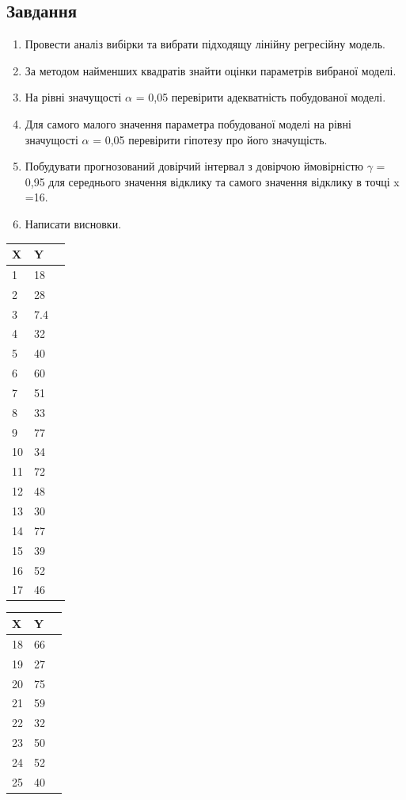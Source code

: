 \documentclass{article}
\begin{document}
    \subsection{Завдання}
      \begin{enumerate}
        \item Провести аналіз вибірки та вибрати підходящу лінійну регресійну модель.
        \item За методом найменших квадратів знайти оцінки параметрів вибраної моделі.
        \item На рівні значущості $\alpha$ = 0,05 перевірити адекватність побудованої моделі.
        \item Для самого малого значення параметра побудованої моделі на рівні значущості
        $\alpha$ = 0,05 перевірити гіпотезу про його значущість.
        \item Побудувати прогнозований довірчий інтервал з довірчою ймовірністю $\gamma$ = 0,95 
        для середнього значення відклику та самого значення відклику в точці x =16.
        \item Написати висновки.
      \end{enumerate}
      \begin{center}
        \begin{tabular}{| l | l | l |}
          \hline
          X & Y \\
          \hline
          1 & 18 \\
          2 & 28 \\
          3 & 7.4 \\
          4 & 32 \\
          5 & 40 \\
          6 & 60 \\
          7 & 51 \\
          8 & 33 \\
          9 & 77 \\
          10 & 34 \\
          11 & 72 \\
          12 & 48 \\
          13 & 30 \\
          14 & 77 \\
          15 & 39 \\
          16 & 52 \\
          17 & 46 \\
          \hline
        \end{tabular}
        \;\;\;\;\;\;\;\;\;\;\;\;\;\;\;\;
        \begin{tabular}{| l | l | l |}
          \hline
          X & Y \\
          \hline
          18 & 66 \\
          19 & 27 \\
          20 & 75 \\
          21 & 59 \\
          22 & 32 \\
          23 & 50 \\
          24 & 52 \\
          25 & 40 \\
          \hline
        \end{tabular}
      \end{center}
\end{document}
